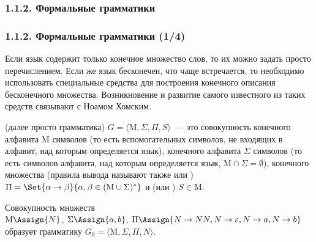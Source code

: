 \subsubsection{1.1.2. Формальные грамматики}\label{1.1.2.}
\begin{frame}
\frametitle{1.1.2. Формальные грамматики (1/4)}

Если язык содержит только конечное множество
слов, то их можно задать просто перечислением.
Если же язык бесконечен, что чаще встречается,
то необходимо использовать специальные средства
для построения конечного описания бесконечного множества.
Возникновение и развитие самого известного из таких средств 
связывают с Ноамом Хомским.
  
\smallskip 
{}
 (далее просто грамматика)
$G=\langle \mathrm{M}, \Sigma, \Pi, S\rangle$~--- это совокупность конечного
алфавита $\mathrm{M}$ 
символов (то есть вспомогательных символов, не входящих в алфавит, над которым определяется язык), конечного алфавита $\Sigma$
 символов (то есть  символов алфавита, над которым определяется язык, 
$\mathrm{M}\cap \Sigma = \emptyset$), конечного множества 
(правила вывода называют также 
или )
$\Pi=\Set{\alpha\rightarrow\beta}{\alpha,\beta\in (\mathrm{M}\cup \Sigma)^*}$ и
 (или ) $S \in \mathrm{M}$.


\begin{example}
Совокупность множеств \\
$\mathrm{M}\Assign \{N\}$,
$\Sigma\Assign\{a,b\}$,
$\Pi\Assign\{N\to NN, N\to \varepsilon, N\to a,
N\to b\}$ \\ образует грамматику  
$G_0=\langle \mathrm{M},\Sigma, \Pi, N\rangle$.
\end{example}

\end{frame}

